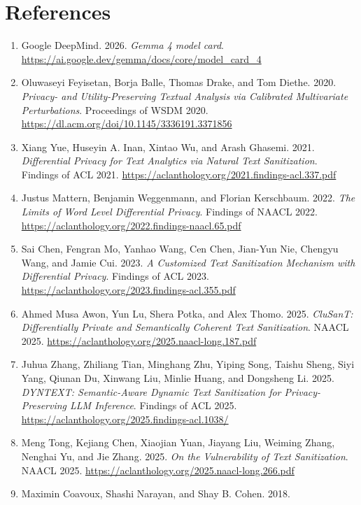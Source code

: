 \section{References}\label{references}

\begin{enumerate}
\def\labelenumi{\arabic{enumi}.}
\tightlist
\item
  Google DeepMind. 2026. \emph{Gemma 4 model card}.
  \url{https://ai.google.dev/gemma/docs/core/model_card_4}
\item
  Oluwaseyi Feyisetan, Borja Balle, Thomas Drake, and Tom Diethe. 2020.
  \emph{Privacy- and Utility-Preserving Textual Analysis via Calibrated
  Multivariate Perturbations}. Proceedings of WSDM 2020.
  \url{https://dl.acm.org/doi/10.1145/3336191.3371856}
\item
  Xiang Yue, Huseyin A. Inan, Xintao Wu, and Arash Ghasemi. 2021.
  \emph{Differential Privacy for Text Analytics via Natural Text
  Sanitization}. Findings of ACL 2021.
  \url{https://aclanthology.org/2021.findings-acl.337.pdf}
\item
  Justus Mattern, Benjamin Weggenmann, and Florian Kerschbaum. 2022.
  \emph{The Limits of Word Level Differential Privacy}. Findings of
  NAACL 2022. \url{https://aclanthology.org/2022.findings-naacl.65.pdf}
\item
  Sai Chen, Fengran Mo, Yanhao Wang, Cen Chen, Jian-Yun Nie, Chengyu
  Wang, and Jamie Cui. 2023. \emph{A Customized Text Sanitization
  Mechanism with Differential Privacy}. Findings of ACL 2023.
  \url{https://aclanthology.org/2023.findings-acl.355.pdf}
\item
  Ahmed Musa Awon, Yun Lu, Shera Potka, and Alex Thomo. 2025.
  \emph{CluSanT: Differentially Private and Semantically Coherent Text
  Sanitization}. NAACL 2025.
  \url{https://aclanthology.org/2025.naacl-long.187.pdf}
\item
  Juhua Zhang, Zhiliang Tian, Minghang Zhu, Yiping Song, Taishu Sheng,
  Siyi Yang, Qiunan Du, Xinwang Liu, Minlie Huang, and Dongsheng Li.
  2025. \emph{DYNTEXT: Semantic-Aware Dynamic Text Sanitization for
  Privacy-Preserving LLM Inference}. Findings of ACL 2025.
  \url{https://aclanthology.org/2025.findings-acl.1038/}
\item
  Meng Tong, Kejiang Chen, Xiaojian Yuan, Jiayang Liu, Weiming Zhang,
  Nenghai Yu, and Jie Zhang. 2025. \emph{On the Vulnerability of Text
  Sanitization}. NAACL 2025.
  \url{https://aclanthology.org/2025.naacl-long.266.pdf}
\item
  Maximin Coavoux, Shashi Narayan, and Shay B. Cohen. 2018.

\end{enumerate}
